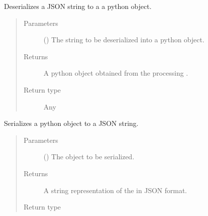 \documentclass[letterpaper,10pt,english]{sphinxmanual}
\begin{document}
\begin{fulllineitems}
\label{\detokenize{app.utils:app.utils.convertions.json_string_to_obj}}
Deserializes a JSON string to a a python object.
\begin{quote}\begin{description}
\item[{Parameters}] \leavevmode
{} () \textendash{} The string to be deserialized into a python object.

\item[{Returns}] \leavevmode
A python object obtained from the processing .

\item[{Return type}] \leavevmode
Any

\end{description}\end{quote}

\end{fulllineitems}


\begin{fulllineitems}
\label{\detokenize{app.utils:app.utils.convertions.obj_to_json_string}}
Serializes a python object to a JSON string.
\begin{quote}\begin{description}
\item[{Parameters}] \leavevmode
{} () \textendash{} The object to be serialized.

\item[{Returns}] \leavevmode
A string representation of the  in JSON format.

\item[{Return type}] \leavevmode
{}

\end{description}\end{quote}

\end{fulllineitems}
\end{document}
